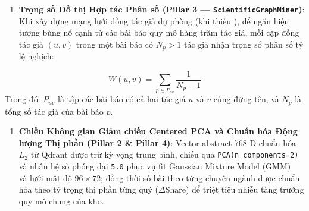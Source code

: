 \begin{enumerate}[label=\textbf{\arabic*.}, start=3]
  \item \textbf{Trọng số Đồ thị Hợp tác Phân số (Pillar 3 --- \texttt{ScientificGraphMiner})}: Khi xây dựng mạng lưới đồng tác giả dự phòng (khi thiếu ), để ngăn hiện tượng bùng nổ cạnh từ các bài báo quy mô hàng trăm tác giả, mỗi cặp đồng tác giả $(u, v)$ trong một bài báo có $N_p > 1$ tác giả nhận trọng số phân số tỷ lệ nghịch:
\end{enumerate}
\begin{equation}
  W(u, v) = \sum_{p \in P_{uv}} \frac{1}{N_p - 1}
  \label{eq:ch2_frac_weight}
\end{equation}
\noindent Trong đó: $P_{uv}$ là tập các bài báo có cả hai tác giả $u$ và $v$ cùng đứng tên, và $N_p$ là tổng số tác giả của bài báo $p$.

\begin{enumerate}[label=\textbf{\arabic*.}, start=4]
  \item \textbf{Chiếu Không gian Giảm chiều Centered PCA và Chuẩn hóa Động lượng Thị phần (Pillar 2 \& Pillar 4)}: Vector abstract 768-D chuẩn hóa $L_2$ từ Qdrant được trừ kỳ vọng trung bình, chiếu qua \texttt{PCA(n\_components=2)} và nhân hệ số phóng đại \texttt{5.0} phục vụ fit Gaussian Mixture Model (GMM)~\cite{dempster1977maximum} và lưới mật độ $96 \times 72$; đồng thời số bài theo từng chuyên ngành được chuẩn hóa theo tỷ trọng thị phần từng quý ($\Delta\text{Share}$) để triệt tiêu nhiễu tăng trưởng quy mô chung của kho.
\end{enumerate}

